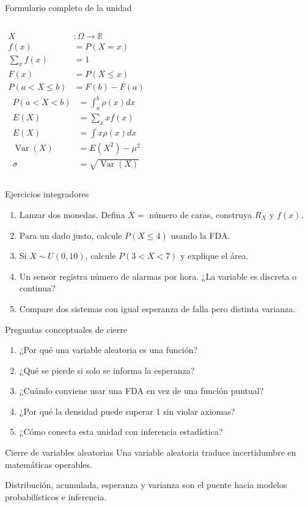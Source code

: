 \documentclass[aspectratio=169,11pt]{beamer}
\begin{document}
\begin{frame}{Formulario completo de la unidad}
\small
\begin{columns}[T]
\begin{align*}
X&:\Omega\to\mathbb{R}\\
f(x)&=P(X=x)\\
\sum_x f(x)&=1\\
F(x)&=P(X\le x)\\
P(a<X\le b)&=F(b)-F(a)
\end{align*}
\begin{align*}
P(a<X<b)&=\int_a^b\rho(x)dx\\
E(X)&=\sum_x xf(x)\\
E(X)&=\int x\rho(x)dx\\
\operatorname{Var}(X)&=E(X^2)-\mu^2\\
\sigma&=\sqrt{\operatorname{Var}(X)}
\end{align*}
\end{columns}
\end{frame}

\begin{frame}{Ejercicios integradores}
\small
\begin{enumerate}
  \item Lanzar dos monedas. Defina $X=$ número de caras, construya $R_X$ y $f(x)$.
  \item Para un dado justo, calcule $P(X\le4)$ usando la FDA.
  \item Si $X\sim U(0,10)$, calcule $P(3<X<7)$ y explique el área.
  \item Un sensor registra número de alarmas por hora. ¿La variable es discreta o continua?
  \item Compare dos sistemas con igual esperanza de falla pero distinta varianza.
\end{enumerate}
\end{frame}

\begin{frame}{Preguntas conceptuales de cierre}
\begin{enumerate}
  \item ¿Por qué una variable aleatoria es una función?
  \item ¿Qué se pierde si solo se informa la esperanza?
  \item ¿Cuándo conviene usar una FDA en vez de una función puntual?
  \item ¿Por qué la densidad puede superar 1 sin violar axiomas?
  \item ¿Cómo conecta esta unidad con inferencia estadística?
\end{enumerate}
\end{frame}

\begin{frame}{Cierre de variables aleatorias}
\centering
\Large
Una variable aleatoria traduce incertidumbre en matemáticas operables.
\vspace{0.8em}

\normalsize
Distribución, acumulada, esperanza y varianza son el puente hacia modelos probabilísticos e inferencia.
\end{frame}
\end{document}
